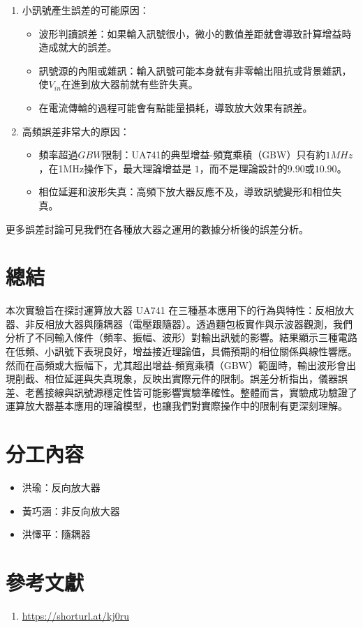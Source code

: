 \documentclass[12pt,a4paper]{article}
\begin{document}
\begin{CJK}{UTF8}{bkai}
\begin{enumerate}
    \item 小訊號產生誤差的可能原因：
    \begin{itemize}
        \item 波形判讀誤差：如果輸入訊號很小，微小的數值差距就會導致計算增益時造成就大的誤差。
        \item 訊號源的內阻或雜訊：輸入訊號可能本身就有非零輸出阻抗或背景雜訊，使$V_{in}$在進到放大器前就有些許失真。
        \item 在電流傳輸的過程可能會有點能量損耗，導致放大效果有誤差。
    \end{itemize}
    \item 高頻誤差非常大的原因：
    \begin{itemize}
        \item 頻率超過$GBW$限制：UA741的典型增益-頻寬乘積（GBW）只有約$1MHz$，在1MHz操作下，最大理論增益是 $1$，而不是理論設計的$9.90$或$10.90$。
        \item 相位延遲和波形失真：高頻下放大器反應不及，導致訊號變形和相位失真。
    \end{itemize}
\end{enumerate}

更多誤差討論可見我們在各種放大器之運用的數據分析後的誤差分析。




\section{總結}
\hfill

本次實驗旨在探討運算放大器 UA741 在三種基本應用下的行為與特性：反相放大器、非反相放大器與隨耦器（電壓跟隨器）。透過麵包板實作與示波器觀測，我們分析了不同輸入條件（頻率、振幅、波形）對輸出訊號的影響。結果顯示三種電路在低頻、小訊號下表現良好，增益接近理論值，具備預期的相位關係與線性響應。然而在高頻或大振幅下，尤其超出增益-頻寬乘積（GBW）範圍時，輸出波形會出現削截、相位延遲與失真現象，反映出實際元件的限制。誤差分析指出，儀器誤差、老舊接線與訊號源穩定性皆可能影響實驗準確性。整體而言，實驗成功驗證了運算放大器基本應用的理論模型，也讓我們對實際操作中的限制有更深刻理解。


\section{分工內容}
\begin{itemize}
    \item 洪瑜：反向放大器
    \item 黃巧涵：非反向放大器
    \item 洪懌平：隨耦器
\end{itemize}

\section{參考文獻}
\hfill
\begin{enumerate}
    \item \url{https://shorturl.at/kj0ru}
\end{enumerate}


\end{CJK}
\end{document}
